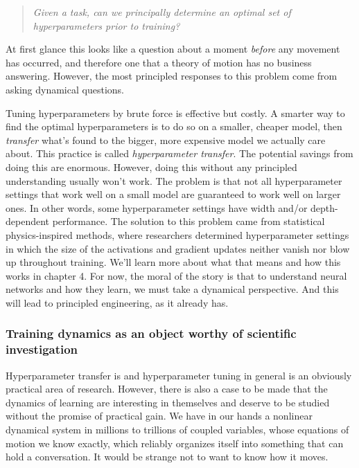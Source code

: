 \begin{quote}
\textit{Given a task, can we principally determine an optimal set of hyperparameters prior to training?}
\end{quote}

At first glance this looks like a question about a moment \textit{before} any movement has occurred, and therefore one that a theory of motion has no business answering. However, the most principled responses to this problem come from asking dynamical questions. 

Tuning hyperparameters by brute force is effective but costly. A smarter way to find the optimal hyperparameters is to do so on a smaller, cheaper model, then \textit{transfer} what's found to the bigger, more expensive model we actually care about. This practice is called \textit{hyperparameter transfer}. The potential savings from doing this are enormous. However, doing this without any principled understanding usually won't work. The problem is that not all hyperparameter settings that work well on a small model are guaranteed to work well on larger ones. In other words, some hyperparameter settings have width and/or depth-dependent performance. The solution to this problem came from statistical physics-inspired methods, where researchers determined hyperparameter settings in which the size of the activations and gradient updates neither vanish nor blow up throughout training. We'll learn more about what that means and how this works in chapter 4. For now, the moral of the story is that to understand neural networks and how they learn, we must take a dynamical perspective. And this will lead to principled engineering, as it already has.

\subsubsection*{Training dynamics as an object worthy of scientific investigation}

Hyperparameter transfer is and hyperparameter tuning in general is an obviously practical area of research. However, there is also a case to be made that the dynamics of learning are interesting in themselves and deserve to be studied without the promise of practical gain. We have in our hands a nonlinear dynamical system in millions to trillions of coupled variables, whose equations of motion we know exactly, which reliably organizes itself into something that can hold a conversation. It would be strange not to want to know how it moves.

